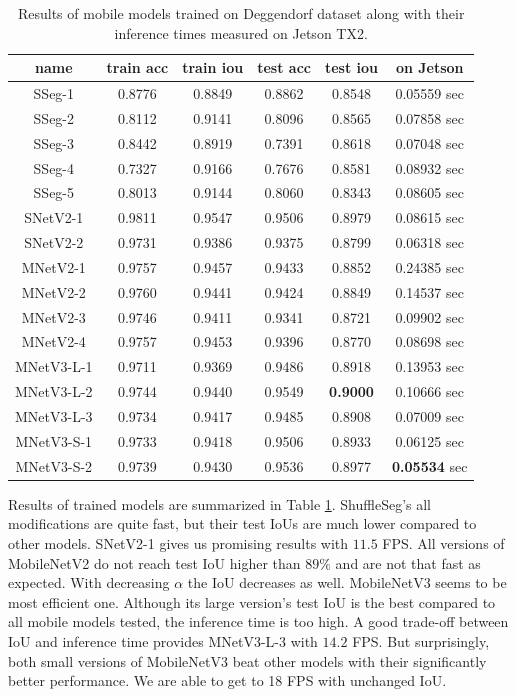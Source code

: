 \begin{table}[h]
	\centering
	\begin{tabular}{|c||c|c|c|c|c|}
	    \hline
		name & train acc & train iou & test acc & test iou & on Jetson \\
		\hline
        SSeg-1 & 0.8776 & 0.8849 & 0.8862 & 0.8548 & 0.05559 sec \\
        SSeg-2 & 0.8112 & 0.9141 & 0.8096 & 0.8565 & 0.07858 sec \\
        SSeg-3 & 0.8442 & 0.8919 & 0.7391 & 0.8618 & 0.07048 sec \\
        SSeg-4 & 0.7327 & 0.9166 & 0.7676 & 0.8581 & 0.08932 sec \\
        SSeg-5 & 0.8013 & 0.9144 & 0.8060 & 0.8343 & 0.08605 sec \\
		\hline
		SNetV2-1 & 0.9811 & 0.9547 & 0.9506 & 0.8979 & 0.08615 sec \\
		SNetV2-2 & 0.9731 & 0.9386 & 0.9375 & 0.8799 & 0.06318 sec \\
		\hline
		MNetV2-1 & 0.9757 & 0.9457 & 0.9433 & 0.8852 & 0.24385 sec \\
		MNetV2-2 & 0.9760 & 0.9441 & 0.9424 & 0.8849 & 0.14537 sec \\
		MNetV2-3 & 0.9746 & 0.9411 & 0.9341 & 0.8721 & 0.09902 sec \\
		MNetV2-4 & 0.9757 & 0.9453 & 0.9396 & 0.8770 & 0.08698 sec \\
		\hline
		MNetV3-L-1 & 0.9711 & 0.9369 & 0.9486 & 0.8918 & 0.13953 sec \\
		MNetV3-L-2 & 0.9744 & 0.9440 & 0.9549 & \textbf{0.9000} & 0.10666 sec \\
		MNetV3-L-3 & 0.9734 & 0.9417 & 0.9485 & 0.8908 & 0.07009 sec \\
		\hline
		MNetV3-S-1 & 0.9733 & 0.9418 & 0.9506 & 0.8933 & 0.06125 sec \\
		MNetV3-S-2 & 0.9739 & 0.9430 & 0.9536 & 0.8977 & \textbf{0.05534} sec \\
		\hline
	\end{tabular}
	\caption[Results of mobile models training]{Results of mobile models trained on Deggendorf dataset along with their inference times measured on Jetson TX2.}
	\label{tab:mobilenets_results}
\end{table}

Results of trained models are summarized in Table \ref{tab:mobilenets_results}. ShuffleSeg's
all modifications are quite fast, but their test IoUs are much lower compared to other models. 
SNetV2-1 gives us promising results with $11.5$ FPS. All versions of MobileNetV2 do not reach
test IoU higher than $89\%$ and are not that fast as expected. With decreasing $\alpha$ the
IoU decreases as well. MobileNetV3 seems to be most efficient one. Although its large version's
test IoU is the best compared to all mobile models tested, the inference time is too high.
A good trade-off between IoU and inference time provides MNetV3-L-3 with $14.2$ FPS. But
surprisingly, both small versions of MobileNetV3 beat other models with their significantly better
performance. We are able to get to 18 FPS with unchanged IoU.

